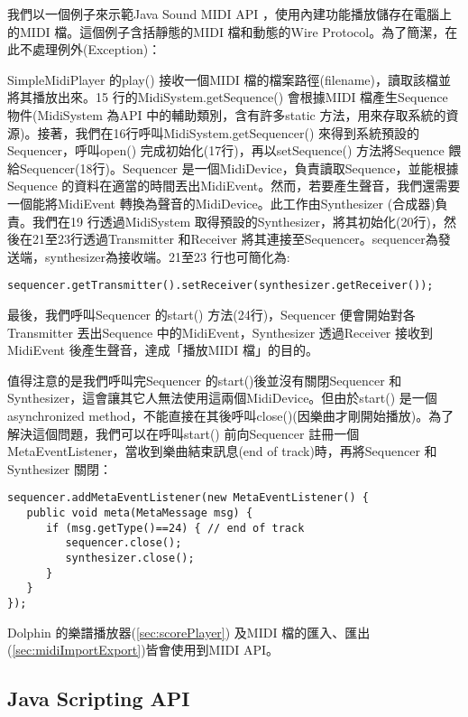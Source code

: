 \documentclass[12pt,a4paper,oneside]{report}
\begin{document}
我們以一個例子來示範Java Sound MIDI API ，使用內建功能播放儲存在電腦上的MIDI 檔。這個例子含括靜態的MIDI 檔和動態的Wire Protocol。為了簡潔，在此不處理例外(Exception)：



SimpleMidiPlayer 的play() 接收一個MIDI 檔的檔案路徑(filename)，讀取該檔並將其播放出來。15 行的MidiSystem.getSequence() 會根據MIDI 檔產生Sequence 物件(MidiSystem 為API 中的輔助類別，含有許多static 方法，用來存取系統的資源)。接著，我們在16行呼叫MidiSystem.getSequencer() 來得到系統預設的Sequencer，呼叫open() 完成初始化(17行)，再以setSequence() 方法將Sequence 餵給Sequencer(18行)。Sequencer 是一個MidiDevice，負責讀取Sequence，並能根據Sequence 的資料在適當的時間丟出MidiEvent。然而，若要產生聲音，我們還需要一個能將MidiEvent 轉換為聲音的MidiDevice。此工作由Synthesizer (合成器)負責。我們在19 行透過MidiSystem 取得預設的Synthesizer，將其初始化(20行)，然後在21至23行透過Transmitter 和Receiver 將其連接至Sequencer。sequencer為發送端，synthesizer為接收端。21至23 行也可簡化為:

\begin{verbatim}
sequencer.getTransmitter().setReceiver(synthesizer.getReceiver());
\end{verbatim}

最後，我們呼叫Sequencer 的start() 方法(24行)，Sequencer 便會開始對各Transmitter 丟出Sequence 中的MidiEvent，Synthesizer 透過Receiver 接收到MidiEvent 後產生聲音，達成「播放MIDI 檔」的目的。

值得注意的是我們呼叫完Sequencer 的start()後並沒有關閉Sequencer 和Synthesizer，這會讓其它人無法使用這兩個MidiDevice。但由於start() 是一個asynchronized method，不能直接在其後呼叫close()(因樂曲才剛開始播放)。為了解決這個問題，我們可以在呼叫start() 前向Sequencer 註冊一個MetaEventListener，當收到樂曲結束訊息(end of track)時，再將Sequencer 和Synthesizer 關閉：

\begin{verbatim}
sequencer.addMetaEventListener(new MetaEventListener() {
   public void meta(MetaMessage msg) {
      if (msg.getType()==24) { // end of track
         sequencer.close();
         synthesizer.close();
      }
   }
});
\end{verbatim}

Dolphin 的樂譜播放器(\ref{sec:scorePlayer}) 及MIDI 檔的匯入、匯出(\ref{sec:midiImportExport})皆會使用到MIDI API。

\subsection{Java Scripting API} %
\end{document}
